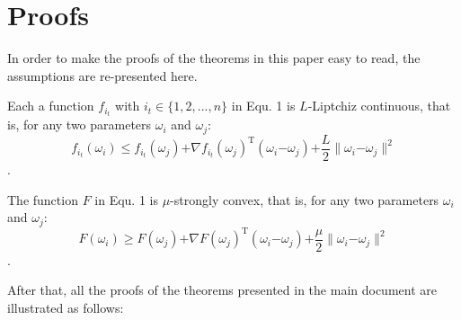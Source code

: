 \documentclass[letterpaper]{article}
\begin{document}
\section{Proofs}
\label{sect_proofs}
In order to make the proofs of the theorems in this paper easy to read, the  assumptions are re-presented here. 



\begin{Assumption}
Each a function $f_{i_t}$ with $i_t\in\{1,2, ..., n\}$ in Equ. 1 is $L$-Liptchiz continuous, that is, for any two parameters $\omega_i$ and $\omega_j$:
\label{assumption_liptchiz}
\begin{equation}
\label{equa_l_smooth} 
f_{i_t}(\omega_i)\le f_{i_t}(\omega_j)\mathrm{+}\nabla f_{i_t}(\omega_j)^\mathrm{T} (\omega_i\mathrm{-}\omega_j)\mathrm{+}\frac{L}{2}\parallel \omega_i\mathrm{-}\omega_j\parallel^2
 \end{equation}.

\end{Assumption}

\begin{Assumption}
\label{assumption_strongly_convex}
The function $F$ in Equ. 1 is $\mu$-strongly convex, that is, for any two parameters $\omega_i$ and $\omega_j$:
\begin{equation}
F(\omega_i)\ge F(\omega_j)\mathrm{+}\nabla F(\omega_j)^\mathrm{T} (\omega_i\mathrm{-}\omega_j)\mathrm{+}\frac{\mu}{2}\parallel \omega_i\mathrm{-}\omega_j\parallel^2
\end{equation}.

\end{Assumption}

After that, all the proofs of the theorems presented in the main document are illustrated as follows:
\end{document}
